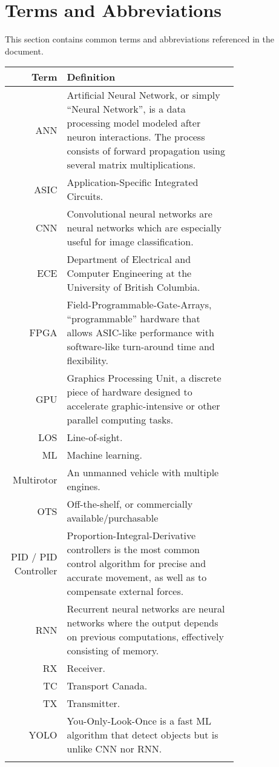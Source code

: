 \thispagestyle{empty}

\section*{Terms and Abbreviations}

This section contains common terms and abbreviations referenced in the document.

\begin{tabular}[h]{rp{0.75\linewidth}}
    \hline
    \textbf{Term} & \textbf{Definition}\\
    \hline

    ANN & Artificial Neural Network, or simply ``Neural Network'', is a data processing model modeled after neuron interactions. The process consists of forward propagation using several matrix multiplications.\cite{ann}\\
    ASIC & Application-Specific Integrated Circuits.\\
    CNN & Convolutional neural networks are neural networks which are especially useful for image classification.\cite{cnn} \\
    ECE & Department of Electrical and Computer Engineering at the University of British Columbia.\\
    FPGA & Field-Programmable-Gate-Arrays, ``programmable'' hardware that allows ASIC-like performance with software-like turn-around time and flexibility.\\
    GPU & Graphics Processing Unit, a discrete piece of hardware designed to accelerate graphic-intensive or other parallel computing tasks.\\
    LOS & Line-of-sight.\\
    ML & Machine learning.\\
    Multirotor & An unmanned vehicle with multiple engines. \\
    OTS & Off-the-shelf, or commercially available/purchasable \\
    PID / PID Controller & Proportion-Integral-Derivative controllers is the most common control algorithm for precise and accurate movement, as well as to compensate external forces.\cite{pid}\\
    RNN & Recurrent neural networks are neural networks where the output depends on previous computations, effectively consisting of memory.\cite{rnn}\\
    RX & Receiver.\\
    TC & Transport Canada.\\
    TX & Transmitter.\\
    YOLO & You-Only-Look-Once is a fast ML algorithm that detect objects but is unlike CNN nor RNN.\cite{yolo}\cite{yolo-2}\\
     & \\

    \hline

\end{tabular}
